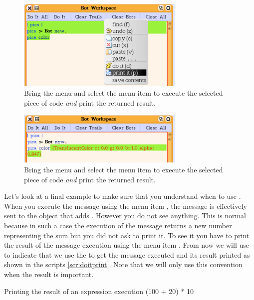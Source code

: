 \begin{figure}
\centerline{\includegraphics[width=8cm]{colorPrintIt}} 
\caption{Bring the menu and select the menu item  to execute the selected piece of code \textit{and} print the returned result.\label{fig:colorPrintIt}}
\end{figure}

\begin{figure}
\centerline{\includegraphics[width=8cm]{resultColorPrintIt}} 
\caption{Bring the menu and select the menu item  to execute the selected piece of code \textit{and} print the returned result.\label{fig:resultColorPrintIt}}
\end{figure}

Let's look at a final example to make sure that you understand when to use  . When you execute the message  using the menu item , the message  is effectively sent to the object  that adds . However you do not see anything. This is normal because in  such a case the execution of the \ct{+} message returns a new number representing the sum but you did not ask \sq to print it. To see it you have to print the result of the message execution using the menu item . From now  we will use \pr to indicate that we use the  to get the message executed and its result printed as shown in the scripts \ref{scr:doitprint}. Note that we will only use this convention when the result is important. 


\begin{scriptwithtitle}{Printing the result of an expression execution}\label{scr:doitprint}
(100 + 20) * 10
\end{scriptwithtitle}


